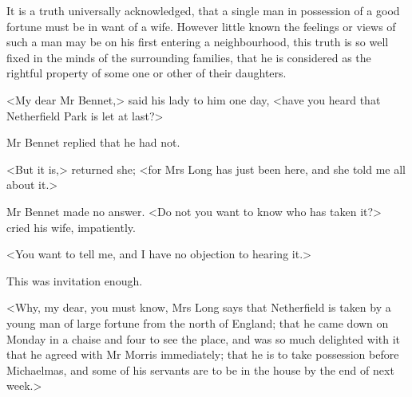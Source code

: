 \begin{pictures}
\begin{letter}
\begin{figure}[t!]
	\end{figure}
\end{letter}

 \thispagestyle{plain}
 \clearpage
\end{pictures}

\begin{placeholder}
It is a truth universally acknowledged, that a single man in possession of a good fortune must be in want of a wife. However little known the feelings or views of such a man may be on his first entering a neighbourhood, this truth is so well fixed in the minds of the surrounding families, that he is considered as the rightful property of some one or other of their daughters.

<My dear Mr Bennet,> said his lady to him one day, <have you heard that Netherfield Park is let at last?>

Mr Bennet replied that he had not.

<But it is,> returned she; <for Mrs Long has just been here, and she told me all about it.>

Mr Bennet made no answer.
<Do not you want to know who has taken it?> cried his wife, impatiently.

<You want to tell me, and I have no objection to hearing it.>
\clearpage
\end{placeholder}

This was invitation enough.

<Why, my dear, you must know, Mrs Long says that Netherfield is taken by a young man of large fortune from the north of England; that he came down on Monday in a chaise and four to see the place, and was so much delighted with it that he agreed with Mr Morris immediately; that he is to take possession before Michaelmas, and some of his servants are to be in the house by the end of next week.>

